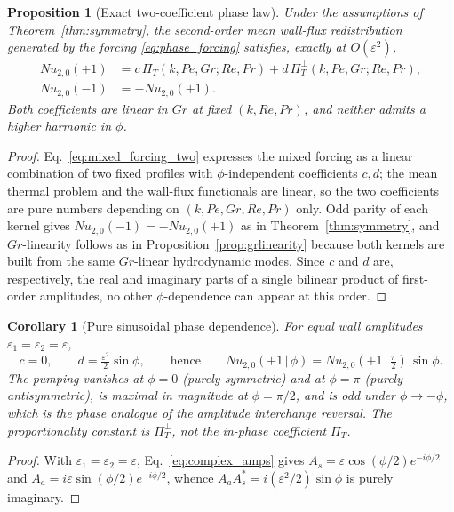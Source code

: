 \documentclass[12pt,a4paper]{article}
\newcommand{\Rey}{\mathit{Re}}
\newcommand{\Pe}{\mathit{Pe}}
\newcommand{\Grr}{\mathit{Gr}}
\newcommand{\Nu}{\mathit{Nu}}
\renewcommand{\Pr}{\mathit{Pr}}
\newcommand{\PiT}{\Pi_T}
\newtheorem{proposition}{Proposition}
\newtheorem{corollary}{Corollary}
\begin{document}
\begin{proposition}[Exact two-coefficient phase law]
\label{prop:phase}
Under the assumptions of Theorem~\ref{thm:symmetry}, the second-order mean wall-flux redistribution
generated by the forcing \eqref{eq:phase_forcing} satisfies, exactly at $O(\varepsilon^2)$,
\begin{equation}
  \boxed{\begin{aligned}
  \Nu_{2,0}(+1)&=c\,\PiT(k,\Pe,\Grr;\Rey,\Pr)
                +d\,\PiT^{\perp}(k,\Pe,\Grr;\Rey,\Pr),\\
  \Nu_{2,0}(-1)&=-\Nu_{2,0}(+1).
  \end{aligned}}
  \label{eq:two_coeff_law}
\end{equation}
Both coefficients are linear in $\Grr$ at fixed $(k,\Rey,\Pr)$, and neither admits a
higher harmonic in $\phi$.
\end{proposition}
\begin{proof}
Eq.~\eqref{eq:mixed_forcing_two} expresses the mixed forcing as a linear combination of
two fixed profiles with $\phi$-independent coefficients $c,d$; the mean thermal problem
and the wall-flux functionals are linear, so the two coefficients are pure numbers
depending on $(k,\Pe,\Grr,\Rey,\Pr)$ only. Odd parity of each kernel gives
$\Nu_{2,0}(-1)=-\Nu_{2,0}(+1)$ as in Theorem~\ref{thm:symmetry}, and $\Grr$-linearity
follows as in Proposition~\ref{prop:grlinearity} because both kernels are built from the
same $\Grr$-linear hydrodynamic modes. Since $c$ and $d$ are, respectively, the real and
imaginary parts of a single bilinear product of first-order amplitudes, no other
$\phi$-dependence can appear at this order.
\end{proof}

\begin{corollary}[Pure sinusoidal phase dependence]
\label{cor:sinphi}
For equal wall amplitudes $\varepsilon_1=\varepsilon_2=\varepsilon$,
\begin{equation}
  c=0,\qquad d=\tfrac{\varepsilon^{2}}{2}\sin\phi,
  \qquad\text{hence}\qquad
  \Nu_{2,0}(+1\,|\,\phi)=\Nu_{2,0}(+1\,|\,\tfrac{\pi}{2})\,\sin\phi .
  \label{eq:sin_phi}
\end{equation}
The pumping vanishes at $\phi=0$ (purely symmetric) and at $\phi=\pi$ (purely
antisymmetric), is maximal in magnitude at $\phi=\pi/2$, and is odd under
$\phi\rightarrow-\phi$, which is the phase analogue of the amplitude interchange
reversal. The proportionality constant is $\PiT^{\perp}$, \emph{not} the in-phase
coefficient $\PiT$.
\end{corollary}
\begin{proof}
With $\varepsilon_1=\varepsilon_2=\varepsilon$, Eq.~\eqref{eq:complex_amps} gives
$A_s=\varepsilon\cos(\phi/2)e^{-i\phi/2}$ and $A_a=i\varepsilon\sin(\phi/2)e^{-i\phi/2}$,
whence $A_aA_s^{*}=i(\varepsilon^{2}/2)\sin\phi$ is purely imaginary.
\end{proof}
\end{document}
